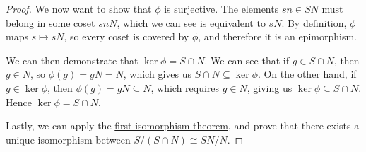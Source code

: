 \begin{proof}
    We now want to show that \(\phi\) is surjective.
    The elements \(sn \in SN\) must belong in some coset \(snN\),
    which we can see is equivalent to \(sN\).
    By definition, \(\phi\) maps \(s \mapsto sN\),
    so every coset is covered by \(\phi\),
    and therefore it is an epimorphism.

    We can then demonstrate that \(\ker\phi = S \cap N\).
    We can see that if \(g \in S \cap N\),
    then \(g \in N\), so \(\phi(g) = gN = N\),
    which gives us \(S \cap N \subseteq \ker\phi\).
    On the other hand, if \(g \in \ker\phi\),
    then \(\phi(g) = gN \subseteq N\),
    which requires \(g \in N\),
    giving us \(\ker\phi \subseteq S \cap N\).
    Hence \(\ker\phi = S \cap N\).

    Lastly, we can apply the
    \hyperref[thm:iso-1-group]{first isomorphism theorem},
    and prove that there exists a unique isomorphism
    between \(S/(S \cap N) \cong SN/N\).
\end{proof}

